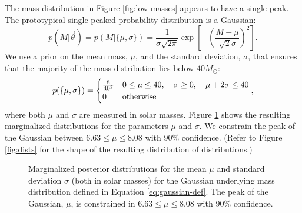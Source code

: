 \documentclass[preprint]{aastex}
\newcommand{\Msun}{M_\odot}
\newcommand{\vtheta}{\vec{\theta}}
\begin{document}
The mass distribution in Figure \ref{fig:low-masses} appears to have a
single peak.  The prototypical single-peaked probability distribution
is a Gaussian:
\begin{equation}
  \label{eq:gaussian-def}
  p(M|\vtheta) = p(M|\{\mu, \sigma\}) = \frac{1}{\sigma \sqrt{2\pi}}
  \exp\left[ - \left(\frac{M - \mu}{\sqrt{2} \sigma} \right)^2 \right].
\end{equation}
We use a prior on the mean mass, $\mu$, and the standard deviation,
$\sigma$, that ensures that the majority of the mass distribution lies
below $40 \Msun$:
\begin{equation}
  \label{eq:gaussian-prior-def}
  p(\{\mu,\sigma\}) = 
  \begin{cases}
    \frac{8}{40^2} & 0 \leq \mu \leq 40, \quad \sigma \geq 0, \quad
    \mu + 2\sigma \leq 40 \\
    0 & \textnormal{otherwise}
  \end{cases},
\end{equation}
where both $\mu$ and $\sigma$ are measured in solar masses.  Figure
\ref{fig:gaussian} shows the resulting marginalized distributions for
the parameters $\mu$ and $\sigma$.  We constrain the peak of the
Gaussian between $6.63 \leq \mu \leq 8.08$ with 90\% confidence.
(Refer to Figure \ref{fig:dists} for the shape of the resulting
distribution of distributions.)

\begin{figure}
  \begin{center}
  \end{center}
  \caption{\label{fig:gaussian} Marginalized posterior distributions
    for the mean $\mu$ and standard deviation $\sigma$ (both in solar
    masses) for the Gaussian underlying mass distribution defined in
    Equation \eqref{eq:gaussian-def}.  The peak of the Gaussian,
    $\mu$, is constrained in $6.63 \leq \mu \leq 8.08$ with 90\%
    confidence.}
\end{figure}
\end{document}
